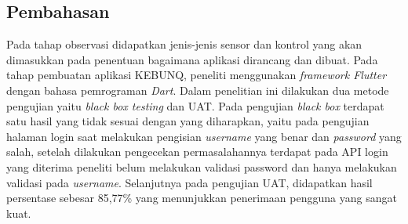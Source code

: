 \begin{flushleft}
\begin{justify}
   
        \section{Pembahasan}
        Pada tahap observasi didapatkan jenis-jenis sensor dan kontrol yang akan dimasukkan pada penentuan bagaimana aplikasi dirancang dan dibuat. Pada tahap pembuatan aplikasi KEBUNQ, peneliti menggunakan \emph{framework Flutter} dengan bahasa pemrograman \emph{Dart}. Dalam penelitian ini dilakukan dua metode pengujian yaitu \emph{black box testing} dan UAT. Pada pengujian \emph{black box} terdapat satu hasil yang tidak sesuai dengan yang diharapkan, yaitu pada
        pengujian halaman login saat melakukan pengisian \emph{username} yang benar dan \emph{password} yang salah, setelah dilakukan pengecekan permasalahannya terdapat pada API login yang diterima peneliti 
        belum melakukan validasi password dan hanya melakukan validasi pada \emph{username}. Selanjutnya pada pengujian UAT, didapatkan hasil persentase sebesar 85,77\% yang menunjukkan penerimaan pengguna yang sangat kuat.
         

    








    \end{justify}




    
\end{flushleft}

\newpage